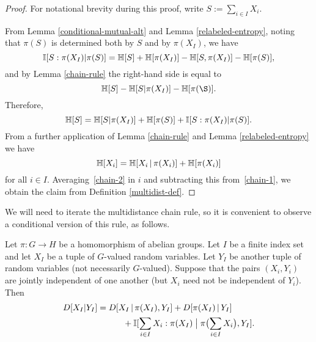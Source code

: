  \begin{proof} For notational brevity during this proof, write $S := \sum_{i \in I} X_i$.

    From Lemma \ref{conditional-mutual-alt} and Lemma \ref{relabeled-entropy}, noting that $\pi(S)$ is determined both by $S$ and by $\pi(X_I)$, we have
  \begin{equation*}
   \mathbb{I}[S:\pi(X_I)|\pi(S)] = \mathbb{H}[S]+\mathbb{H}[\pi(X_I)]-\mathbb{H}[S,\pi(X_I)]-\mathbb{H}[\pi(S)],
  \end{equation*}
  and by Lemma \ref{chain-rule} the right-hand side is equal to
  \begin{equation*}
  \bbH[S]-\bbH[S|\pi(X_I)]-\bbH[\pi(\S)].
  \end{equation*}
  Therefore,
  \begin{equation}\label{chain-1}
  \mathbb{H}[S]=\mathbb{H}[S|\pi(X_I)]+\mathbb{H}[\pi(S)]+\mathbb{I}[S:\pi(X_I)|\pi(S)]. \end{equation}
  From a further application of Lemma \ref{chain-rule} and Lemma \ref{relabeled-entropy} we have
  \begin{equation}\label{chain-2}
    \mathbb{H}[X_i] = \mathbb{H}[X_i \, | \, \pi(X_i)] + \mathbb{H}[\pi(X_i)]
  \end{equation}
  for all $i \in I$.  Averaging~\eqref{chain-2} in $i$ and subtracting this from~\eqref{chain-1}, we obtain the claim from Definition \ref{multidist-def}.
  \end{proof}

  We will need to iterate the multidistance chain rule, so it is convenient to observe a conditional version of this rule, as follows.

  \begin{lemma}\label{multidist-chain-rule-cond}
    Let $\pi \colon G \to H$ be a homomorphism of abelian groups.
    Let $I$ be a finite index set and let $X_{I}$ be a tuple of $G$-valued random variables.
    Let $Y_{I}$ be another tuple of random variables (not necessarily $G$-valued).
    Suppose that the pairs $(X_i, Y_i)$ are jointly independent of one another (but $X_i$ need not be independent of $Y_i$).
    Then
    \begin{align}\nonumber
        D[ X_{I} | Y_{I} ] &=  D[ X_{I} \,|\, \pi(X_{I}), Y_{I}] + D[ \pi(X_{I}) \,|\, Y_{I}] \\
         &\quad\qquad + \mathbb{I}[ \sum_{i\in I} X_i : \pi(X_{I}) \; \big| \;  \pi\bigl(\sum_{i\in I} X_i \bigr), Y_{I} ].\label{chain-eq-cond}
    \end{align}
  \end{lemma}

